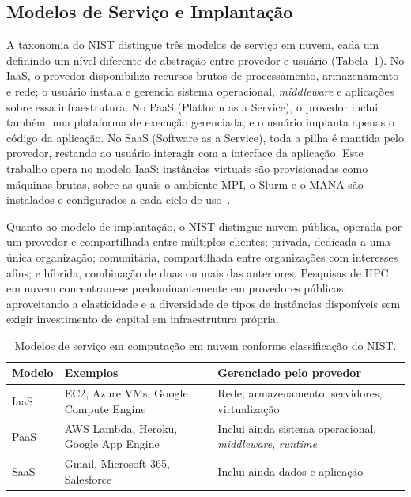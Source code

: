 \subsection{Modelos de Serviço e Implantação}
\label{sec:cloud-modelos}

A taxonomia do NIST distingue três modelos de serviço em nuvem, cada um definindo
um nível diferente de abstração entre provedor e usuário
(Tabela~\ref{tab:service-models}). No IaaS, o provedor disponibiliza recursos
brutos de processamento, armazenamento e rede; o usuário instala e gerencia sistema
operacional, \textit{middleware} e aplicações sobre essa infraestrutura. No PaaS
(Platform as a Service), o provedor inclui também uma plataforma de execução
gerenciada, e o usuário implanta apenas o código da aplicação. No SaaS (Software as
a Service), toda a pilha é mantida pelo provedor, restando ao usuário interagir com
a interface da aplicação. Este trabalho opera no modelo IaaS: instâncias virtuais são
provisionadas como máquinas brutas, sobre as quais o ambiente MPI, o Slurm e o MANA
são instalados e configurados a cada ciclo de uso~\cite{mell2011nist}.

Quanto ao modelo de implantação, o NIST distingue nuvem pública, operada por um
provedor e compartilhada entre múltiplos clientes; privada, dedicada a uma única
organização; comunitária, compartilhada entre organizações com interesses afins; e
híbrida, combinação de duas ou mais das anteriores. Pesquisas de HPC em nuvem
concentram-se predominantemente em provedores públicos, aproveitando a elasticidade
e a diversidade de tipos de instâncias disponíveis sem exigir investimento de capital
em infraestrutura própria.

\begin{table}[htb]
  \centering
  \caption{Modelos de serviço em computação em nuvem conforme classificação do NIST.}
  \label{tab:service-models}
  \begin{tabular}{p{1.8cm}p{5.5cm}p{5.5cm}}
    \toprule
    \textbf{Modelo} & \textbf{Exemplos} & \textbf{Gerenciado pelo provedor} \\
    \midrule
    IaaS & EC2, Azure VMs, Google Compute Engine
         & Rede, armazenamento, servidores, virtualização \\
    PaaS & AWS Lambda, Heroku, Google App Engine
         & Inclui ainda sistema operacional, \textit{middleware}, \textit{runtime} \\
    SaaS & Gmail, Microsoft 365, Salesforce
         & Inclui ainda dados e aplicação \\
    \bottomrule
  \end{tabular}
\end{table}

